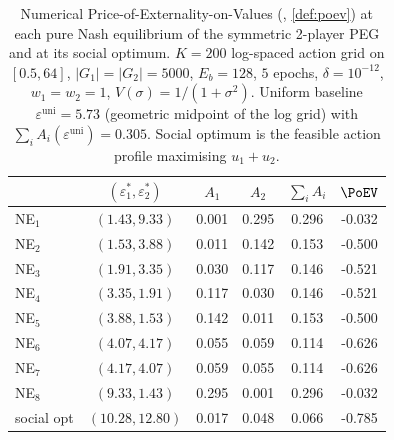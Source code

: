 \begin{table}[t]
\centering
\caption{Numerical Price-of-Externality-on-Values (\PoEV, \cref{def:poev}) at each pure Nash equilibrium of the symmetric 2-player PEG and at its social optimum. $K=200$ log-spaced action grid on $[0.5,64]$, $|G_1|=|G_2|=5000$, $E_b=128$, $5$ epochs, $\delta=10^{-12}$, $w_1=w_2=1$, $V(\sigma) = 1/(1+\sigma^2)$. Uniform baseline $\varepsilon^{\mathrm{uni}} = 5.73$ (geometric midpoint of the log grid) with $\sum_i A_i(\varepsilon^{\mathrm{uni}}) = 0.305$. Social optimum is the feasible action profile maximising $u_1 + u_2$.}
\label{tab:PoEV}
\begin{tabular}{lccccc}
\toprule
 & $(\varepsilon_1^*, \varepsilon_2^*)$ & $A_1$ & $A_2$ & $\sum_i A_i$ & $\PoEV$ \\
\midrule
NE$_{1}$ & $(1.43, 9.33)$ & 0.001 & 0.295 & 0.296 & -0.032 \\
NE$_{2}$ & $(1.53, 3.88)$ & 0.011 & 0.142 & 0.153 & -0.500 \\
NE$_{3}$ & $(1.91, 3.35)$ & 0.030 & 0.117 & 0.146 & -0.521 \\
NE$_{4}$ & $(3.35, 1.91)$ & 0.117 & 0.030 & 0.146 & -0.521 \\
NE$_{5}$ & $(3.88, 1.53)$ & 0.142 & 0.011 & 0.153 & -0.500 \\
NE$_{6}$ & $(4.07, 4.17)$ & 0.055 & 0.059 & 0.114 & -0.626 \\
NE$_{7}$ & $(4.17, 4.07)$ & 0.059 & 0.055 & 0.114 & -0.626 \\
NE$_{8}$ & $(9.33, 1.43)$ & 0.295 & 0.001 & 0.296 & -0.032 \\
social opt & $(10.28, 12.80)$ & 0.017 & 0.048 & 0.066 & -0.785 \\
\bottomrule
\end{tabular}
\end{table}
